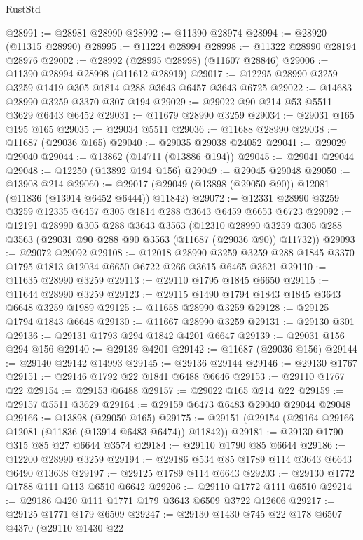 \begin{lexlean}{RustStd}
\begin{coremodule}
@28991 := @28981 @28990
@28992 := @11390 @28974
@28994 := @28920 (@11315 @28990)
@28995 := @11224 @28994
@28998 := @11322 @28990 @28194 @28976
@29002 := @28992 (@28995 @28998) (@11607 @28846)
@29006 := @11390 @28994 @28998 (@11612 @28919)
@29017 := @12295 @28990 @3259 @3259 @1419 @305 @1814 @288 @3643 @6457 @3643 @6725
@29022 := @14683 @28990 @3259 @3370 @307 @194
@29029 := @29022 @90 @214 @53 @5511 @3629 @6443 @6452
@29031 := @11679 @28990 @3259
@29034 := @29031 @165 @195 @165
@29035 := @29034 @5511
@29036 := @11688 @28990
@29038 := @11687 (@29036 @165)
@29040 := @29035 @29038 @24052
@29041 := @29029 @29040
@29044 := @13862 (@14711 (@13886 @194))
@29045 := @29041 @29044
@29048 := @12250 (@13892 @194 @156)
@29049 := @29045 @29048
@29050 := @13908 @214
@29060 := @29017 (@29049 (@13898 (@29050 @90)) @12081 (@11836 (@13914 @6452 @6444)) @11842)
@29072 := @12331 @28990 @3259 @3259 @12335 @6457 @305 @1814 @288 @3643 @6459 @6653 @6723
@29092 := @12191
    @28990
    @305
    @288
    @3643
    @3563
    (@12310 @28990 @3259 @305 @288 @3563 (@29031 @90 @288 @90 @3563 (@11687 (@29036 @90)) @11732))
@29093 := @29072 @29092
@29108 := @12018
    @28990
    @3259
    @3259
    @288
    @1845
    @3370
    @1795
    @1813
    @12034
    @6650
    @6722
    @266
    @3615
    @6465
    @3621
@29110 := @11635 @28990 @3259
@29113 := @29110 @1795 @1845 @6650
@29115 := @11644 @28990 @3259
@29123 := @29115 @1490 @1794 @1843 @1845 @3643 @6648 @3259 @1989
@29125 := @11658 @28990 @3259
@29128 := @29125 @1794 @1843 @6648
@29130 := @11667 @28990 @3259
@29131 := @29130 @301
@29136 := @29131 @1793 @294 @1842 @4201 @6647
@29139 := @29031 @156 @294 @156
@29140 := @29139 @4201
@29142 := @11687 (@29036 @156)
@29144 := @29140 @29142 @14993
@29145 := @29136 @29144
@29146 := @29130 @1767
@29151 := @29146 @1792 @22 @1841 @6488 @6646
@29153 := @29110 @1767 @22
@29154 := @29153 @6488
@29157 := @29022 @165 @214 @22
@29159 := @29157 @5511 @3629
@29164 := @29159 @6473 @6483 @29040 @29044 @29048
@29166 := @13898 (@29050 @165)
@29175 := @29151 (@29154 (@29164 @29166 @12081 (@11836 (@13914 @6483 @6474)) @11842))
@29181 := @29130 @1790 @315 @85 @27 @6644 @3574
@29184 := @29110 @1790 @85 @6644
@29186 := @12200 @28990 @3259
@29194 := @29186 @534 @85 @1789 @114 @3643 @6643 @6490 @13638
@29197 := @29125 @1789 @114 @6643
@29203 := @29130 @1772 @1788 @111 @113 @6510 @6642
@29206 := @29110 @1772 @111 @6510
@29214 := @29186 @420 @111 @1771 @179 @3643 @6509 @3722 @12606
@29217 := @29125 @1771 @179 @6509
@29247 := @29130
    @1430
    @745
    @22
    @178
    @6507
    @4370
    (@29110
      @1430
      @22

\end{coremodule}
\end{lexlean}
